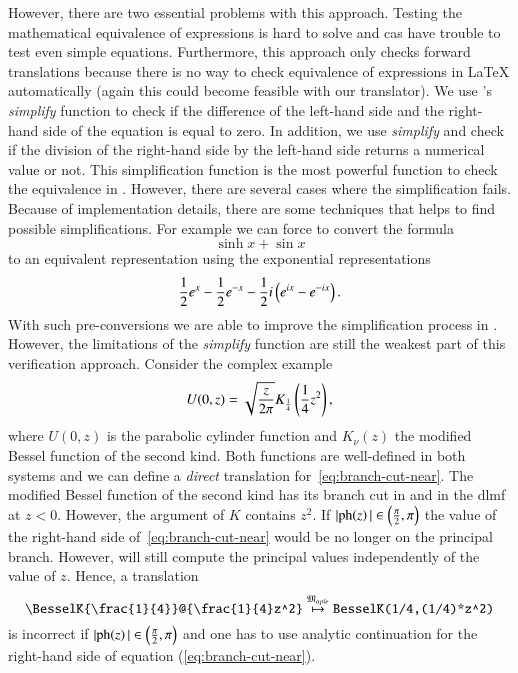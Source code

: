 However, there are two essential problems with this approach. Testing the mathematical equivalence of expressions is hard to solve and \gls*{cas} have trouble to test even simple equations. Furthermore, this approach only checks forward translations because there is no way to check equivalence of expressions in \LaTeX{} automatically (again this could become feasible with our translator). We use \Maple's \textit{simplify} function to check if the difference of the left-hand side and the right-hand side of the equation is equal to zero. In addition, we use \textit{simplify} and check if the division of the right-hand side by the left-hand side returns a numerical value or not. This simplification function is the most powerful function to check the equivalence in \Maple. However, there are several cases where the simplification fails. Because of implementation details, there are some techniques that helps \Maple{} to find possible simplifications. For example we can force \Maple{} to convert the formula
\begin{equation}
\sinh{x} + \sin{x}
\end{equation}
to an equivalent representation using the exponential representations
\begin{equation}
\frac{1}{2}{e}^x - \frac{1}{2}{e}^{-x} - \frac{1}{2} {i} \left( {e}^{{i} x}-{e}^{-{i} x} \right).
\end{equation}
With such pre-conversions we are able to improve the simplification process in \Maple. However, the limitations of the \textit{simplify} function are still the weakest part of this verification approach. Consider the complex example~\parencite[eq. 12.7.10]{NIST:DLMF}
\begin{equation}\label{eq:branch-cut-near}
\displaystyle U(0,z) = \sqrt{\frac{z}{2{\pi}}} K_{\frac{1}{4}}\left(\frac{1}{4}z^2\right),
\end{equation}
where $U(0,z)$ is the parabolic cylinder function and $K_\nu(z)$ the modified Bessel function of the second kind. Both functions are well-defined in both systems and we can define a \textit{direct} translation for~\eqref{eq:branch-cut-near}. 
The modified Bessel function of the second kind has its branch cut in \Maple{} and in the \gls*{dlmf} at $z < 0$. However, the argument of $K$ contains $z^2$. If $|\mathrm{ph}\!\left(z\right)| \in \left(\frac{{\pi}}{2}, {\pi}\right)$ the value of the right-hand side of~\eqref{eq:branch-cut-near} would be no longer on the principal branch. However, \Maple{} will still compute the principal values independently of the value of $z$. Hence, a translation
\begin{equation}
\verb|\BesselK{\frac{1}{4}}@{\frac{1}{4}z^2}| \overset{\langMaple}{\mapsto} \verb|BesselK(1/4,(1/4)*z^2)|
\end{equation}
is incorrect if $|\mathrm{ph}\!\left(z\right)| \in \left(\frac{{\pi}}{2}, {\pi}\right)$ and one has to use analytic continuation for the right-hand side of equation (\ref{eq:branch-cut-near}). %

